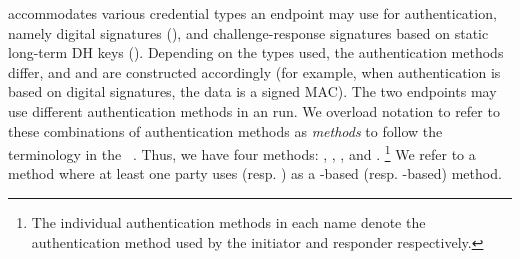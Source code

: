 
\mEdhoc{} accommodates various credential types
an endpoint may use for authentication, 
%
namely 
digital signatures (\mSig), 
and
challenge-response signatures based on static long-term DH keys (\mStat).
%
Depending on the types used, the authentication methods differ,
and \mAuthi{} and \mAuthr{} are constructed accordingly (for example,  when authentication is based on digital signatures, the data is a signed MAC).
%
The two endpoints may use different authentication methods in an \mEdhoc{} run.
%
%
We overload notation to refer to these combinations of authentication methods as
\emph{methods} to follow the terminology in the \mEdhoc{}
\mSpec{}~\cite{selander-lake-edhoc-01}.
%
Thus, we have 
four 
methods: \mSigSig, \mSigStat, \mStatStat, and \mStatSig. %
%
\footnote{The individual authentication methods in each name denote the authentication method used by the initiator and responder respectively.}
%
We refer to a method where at least one party uses \mSig{} (resp. \mStat) as a \mSig-based (resp. \mStat-based)
method.
%

%

 
